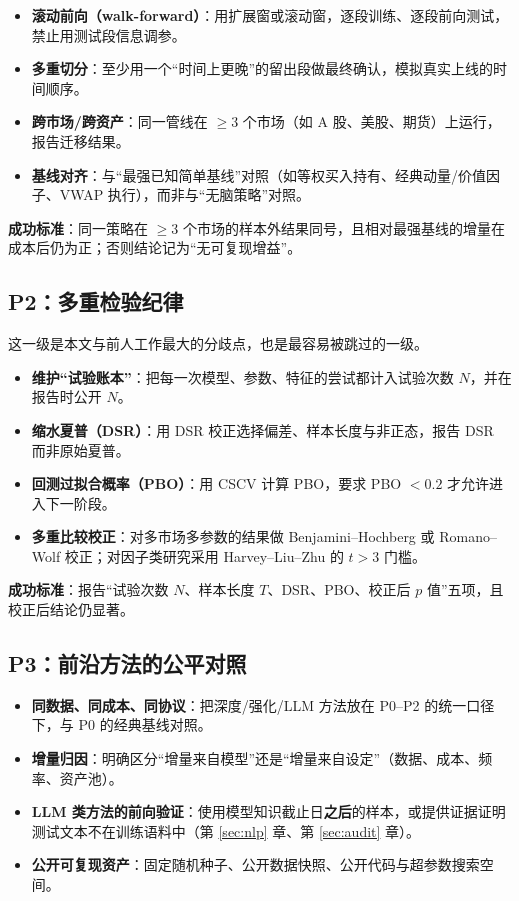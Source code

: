 \begin{itemize}
  \item \textbf{滚动前向（walk-forward）}：用扩展窗或滚动窗，逐段训练、逐段前向测试，禁止用测试段信息调参。
  \item \textbf{多重切分}：至少用一个“时间上更晚”的留出段做最终确认，模拟真实上线的时间顺序。
  \item \textbf{跨市场/跨资产}：同一管线在 $\geq 3$ 个市场（如 A 股、美股、期货）上运行，报告迁移结果。
  \item \textbf{基线对齐}：与“最强已知简单基线”对照（如等权买入持有、经典动量/价值因子、VWAP 执行），而非与“无脑策略”对照。
\end{itemize}

\textbf{成功标准}：同一策略在 $\geq 3$ 个市场的样本外结果同号，且相对最强基线的增量在成本后仍为正；否则结论记为“无可复现增益”。

\subsection{P2：多重检验纪律}

这一级是本文与前人工作最大的分歧点，也是最容易被跳过的一级。

\begin{itemize}
  \item \textbf{维护“试验账本”}：把每一次模型、参数、特征的尝试都计入试验次数 $N$，并在报告时公开 $N$。
  \item \textbf{缩水夏普（DSR）}：用 DSR\cite{bailey2014dsr} 校正选择偏差、样本长度与非正态，报告 DSR 而非原始夏普。
  \item \textbf{回测过拟合概率（PBO）}：用 CSCV\cite{bailey2016pbo} 计算 PBO，要求 PBO $<0.2$ 才允许进入下一阶段。
  \item \textbf{多重比较校正}：对多市场多参数的结果做 Benjamini--Hochberg 或 Romano--Wolf 校正；对因子类研究采用 Harvey--Liu--Zhu 的 $t>3$ 门槛\cite{harveylz2016}。
\end{itemize}

\textbf{成功标准}：报告“试验次数 $N$、样本长度 $T$、DSR、PBO、校正后 $p$ 值”五项，且校正后结论仍显著。

\subsection{P3：前沿方法的公平对照}

\begin{itemize}
  \item \textbf{同数据、同成本、同协议}：把深度/强化/LLM 方法放在 P0--P2 的统一口径下，与 P0 的经典基线对照。
  \item \textbf{增量归因}：明确区分“增量来自模型”还是“增量来自设定”（数据、成本、频率、资产池）。
  \item \textbf{LLM 类方法的前向验证}：使用模型知识截止日\textbf{之后}的样本，或提供证据证明测试文本不在训练语料中（第 \ref{sec:nlp} 章、第 \ref{sec:audit} 章）。
  \item \textbf{公开可复现资产}：固定随机种子、公开数据快照、公开代码与超参数搜索空间。
\end{itemize}


